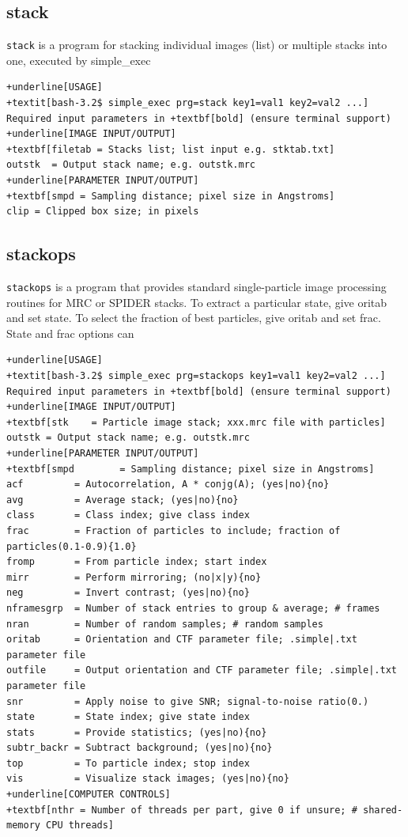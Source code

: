 \documentclass[a4paper,11pt]{article}
\newcommand{\prgname}[1]{\textcolor{NavyBlue}{\texttt{#1}}}
\begin{document}
\subsection{stack}
\label{stack}
\prgname{stack} is a program for stacking individual images (list) or multiple stacks into one, executed by simple\_exec
\begin{Verbatim}[commandchars=+\[\],fontsize=\small,breaklines=true]
+underline[USAGE]
+textit[bash-3.2$ simple_exec prg=stack key1=val1 key2=val2 ...]
Required input parameters in +textbf[bold] (ensure terminal support)
+underline[IMAGE INPUT/OUTPUT]
+textbf[filetab = Stacks list; list input e.g. stktab.txt]
outstk  = Output stack name; e.g. outstk.mrc
+underline[PARAMETER INPUT/OUTPUT]
+textbf[smpd = Sampling distance; pixel size in Angstroms]
clip = Clipped box size; in pixels
\end{Verbatim}

\subsection{stackops}
\label{stackops}
\prgname{stackops} is a program that provides standard single-particle image processing routines for MRC or SPIDER stacks. To extract a particular state, give oritab and set state. To select the fraction of best particles, give oritab and set frac. State and frac options can
\begin{Verbatim}[commandchars=+\[\],fontsize=\small,breaklines=true]
+underline[USAGE]
+textit[bash-3.2$ simple_exec prg=stackops key1=val1 key2=val2 ...]
Required input parameters in +textbf[bold] (ensure terminal support)
+underline[IMAGE INPUT/OUTPUT]
+textbf[stk    = Particle image stack; xxx.mrc file with particles]
outstk = Output stack name; e.g. outstk.mrc
+underline[PARAMETER INPUT/OUTPUT]
+textbf[smpd        = Sampling distance; pixel size in Angstroms]
acf         = Autocorrelation, A * conjg(A); (yes|no){no}
avg         = Average stack; (yes|no){no}
class       = Class index; give class index
frac        = Fraction of particles to include; fraction of particles(0.1-0.9){1.0}
fromp       = From particle index; start index
mirr        = Perform mirroring; (no|x|y){no}
neg         = Invert contrast; (yes|no){no}
nframesgrp  = Number of stack entries to group & average; # frames
nran        = Number of random samples; # random samples
oritab      = Orientation and CTF parameter file; .simple|.txt parameter file
outfile     = Output orientation and CTF parameter file; .simple|.txt parameter file
snr         = Apply noise to give SNR; signal-to-noise ratio(0.)
state       = State index; give state index
stats       = Provide statistics; (yes|no){no}
subtr_backr = Subtract background; (yes|no){no}
top         = To particle index; stop index
vis         = Visualize stack images; (yes|no){no}
+underline[COMPUTER CONTROLS]
+textbf[nthr = Number of threads per part, give 0 if unsure; # shared-memory CPU threads]
\end{Verbatim}
\end{document}
